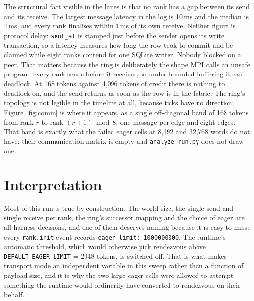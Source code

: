 \documentclass[11pt]{article}
\begin{document}
The structural fact visible in the lanes is that no rank has a gap between its send
and its receive. The largest message latency in the log is 10\,ms and the median is
4\,ms, and every rank finalises within 1\,ms of its own receive. Neither figure is
protocol delay: \texttt{sent\_at} is stamped just before the sender opens its write
transaction, so a latency measures how long the row took to commit and be claimed
while eight ranks contend for one SQLite writer. Nobody blocked on a peer. That
matters because the ring is deliberately the shape MPI calls an
unsafe program: every rank sends before it receives, so under bounded buffering it
can deadlock. At 168 tokens against 4{,}096 tokens of credit there is nothing to
deadlock on, and the send returns as soon as the row is in the fabric. The ring's
topology is not legible in the timeline at all, because ticks have no direction;
Figure~\ref{fig:comm} is where it appears, as a single off-diagonal band of 168
tokens from rank $r$ to rank $(r{+}1) \bmod 8$, one message per edge and eight edges.
That band is exactly what the failed eager cells at 8{,}192 and 32{,}768 words do not
have: their communication matrix is empty and \texttt{analyze\_run.py} does not draw
one.

\section{Interpretation}

Most of this run is true by construction. The world size, the single send and single
receive per rank, the ring's successor mapping and the choice of eager are all
harness decisions, and one of them deserves naming because it is easy to miss: every
\texttt{rank.init} event records \texttt{eager\_limit: 1000000000}. The runtime's
automatic threshold, which would otherwise pick rendezvous above
\texttt{DEFAULT\_EAGER\_LIMIT} = 2048 tokens, is switched off. That is what makes
transport mode an independent variable in this sweep rather than a function of
payload size, and it is why the two large eager cells were allowed to attempt
something the runtime would ordinarily have converted to rendezvous on their behalf.
\end{document}
